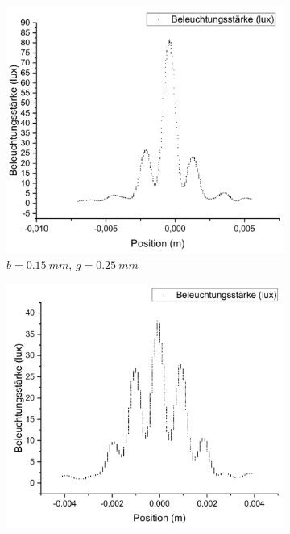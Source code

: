 \documentclass[
	a4paper,
	12pt,
	pagesize,
	ngerman
]{scrartcl}
\begin{document}
	\begin{figure}[H]
		\centering
		\begin{subfigure}{.5\textwidth}
			\centering
			\includegraphics[width=1\linewidth]{Doppelspaltb0-15mmg0-25mm.pdf}
			\caption{$b=\SI{0,15}{mm}$, $ g=\SI{0,25}{mm}$}	
		\end{subfigure}%
		\begin{subfigure}{.5\textwidth}
			\centering
			\includegraphics[width=1\linewidth]{Doppelspaltb0-15mmg0-5mm.pdf}

\end{subfigure}
\end{figure}
\end{document}
